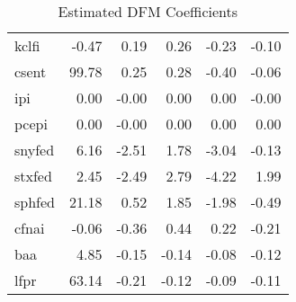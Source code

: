 \documentclass[11pt, letterpaper]{article}\usepackage[]{graphicx}\usepackage[]{color}
\begin{document}
\begin{table}[H]
\begin{tabular}{lrrrrr}
  kclfi & -0.47 & 0.19 & 0.26 & -0.23 & -0.10 \\ 
  csent & 99.78 & 0.25 & 0.28 & -0.40 & -0.06 \\ 
  ipi & 0.00 & -0.00 & 0.00 & 0.00 & -0.00 \\ 
  pcepi & 0.00 & -0.00 & 0.00 & 0.00 & 0.00 \\ 
  snyfed & 6.16 & -2.51 & 1.78 & -3.04 & -0.13 \\ 
  stxfed & 2.45 & -2.49 & 2.79 & -4.22 & 1.99 \\ 
  sphfed & 21.18 & 0.52 & 1.85 & -1.98 & -0.49 \\ 
  cfnai & -0.06 & -0.36 & 0.44 & 0.22 & -0.21 \\ 
  baa & 4.85 & -0.15 & -0.14 & -0.08 & -0.12 \\ 
  lfpr & 63.14 & -0.21 & -0.12 & -0.09 & -0.11 \\ 
   \hline
\end{tabular}
\endgroup
\caption{Estimated DFM Coefficients} 
\end{table}
\end{document}
